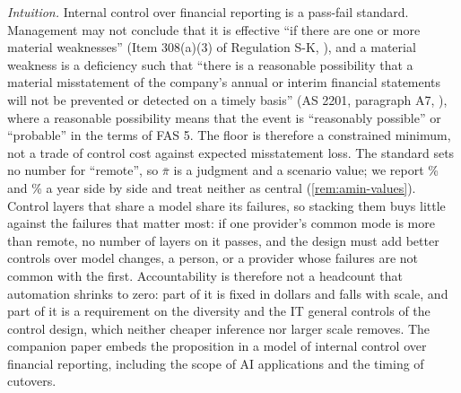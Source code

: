\noindent\emph{Intuition.} Internal control over financial reporting is a pass-fail standard. Management may not conclude that it is effective ``if there are one or more material weaknesses'' (Item 308(a)(3) of Regulation S-K, \citealp{cfr2026sec229308}), and a material weakness is a deficiency such that ``there is a reasonable possibility that a material misstatement of the company's annual or interim financial statements will not be prevented or detected on a timely basis'' (AS 2201, paragraph A7, \citealp{pcaob2026as2201}), where a reasonable possibility means that the event is ``reasonably possible'' or ``probable'' in the terms of FAS 5. The floor is therefore a constrained minimum, not a trade of control cost against expected misstatement loss. The standard sets no number for ``remote'', so $\bar\pi$ is a judgment and a scenario value; we report \AminEpsCen\% and \AminEpsSens\% a year side by side and treat neither as central (\autoref{rem:amin-values}). Control layers that share a model share its failures, so stacking them buys little against the failures that matter most: if one provider's common mode is more than remote, no number of layers on it passes, and the design must add better controls over model changes, a person, or a provider whose failures are not common with the first. Accountability is therefore not a headcount that automation shrinks to zero: part of it is fixed in dollars and falls with scale, and part of it is a requirement on the diversity and the IT general controls of the control design, which neither cheaper inference nor larger scale removes. The companion paper \citep{murthy2026transformation} embeds the proposition in a model of internal control over financial reporting, including the scope of AI applications and the timing of cutovers.

